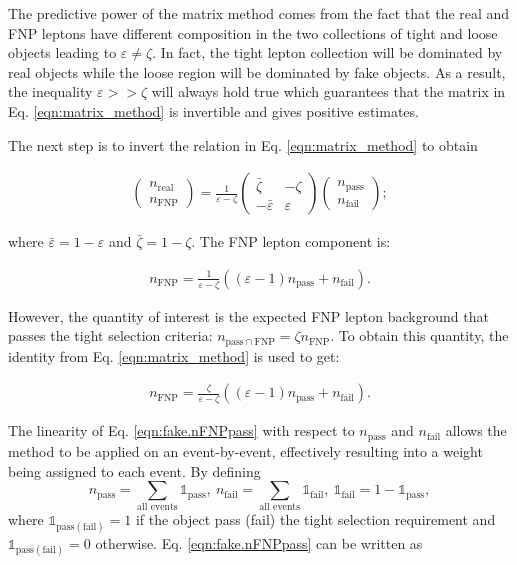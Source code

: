 The predictive power of the matrix method comes from the fact that 
the real and FNP leptons have different composition in the two collections 
of tight and loose objects leading to $\varepsilon \neq \zeta$. In fact, 
the tight lepton collection will be dominated by real objects while the 
loose region will be dominated by fake objects. As a result, 
the inequality $\varepsilon >> \zeta$ will always hold true which 
guarantees that the matrix in Eq. \ref{eqn:matrix_method} is invertible 
and gives positive estimates. 

The next step is to invert the relation in Eq. \ref{eqn:matrix_method} to 
obtain

\begin{align}
\begin{pmatrix}n_\text{real}\\n_\text{FNP}\end{pmatrix} 
= \frac{1}{\varepsilon - \zeta} \begin{pmatrix}\bar\zeta & -\zeta\\ -\bar\varepsilon & \varepsilon\end{pmatrix}
\begin{pmatrix}n_\text{pass}\\n_\text{fail}\end{pmatrix}; 
\label{eqn:fake.inv_matrix_method}
\end{align}

where $\bar\varepsilon = 1 - \varepsilon$ and  $\bar\zeta = 1 - \zeta$. 
The FNP lepton component is: 

\begin{align}
n_\text{FNP} = \frac{1}{\varepsilon - \zeta}\left(\left(\varepsilon-1\right)n_\text{pass}+n_\text{fail}\right).
\label{eqn:fake.nfake}
\end{align}

However, the quantity of interest is the expected FNP lepton background that 
passes the tight selection criteria: 
$n_{\text{pass}~\cap~\text{FNP}} = \zeta n_\text{FNP}$.
 To obtain this quantity, 
the identity from Eq. \ref{eqn:matrix_method} is used to get:

\begin{align}
n_\text{FNP} = \frac{\zeta}{\varepsilon - \zeta}\left(\left(\varepsilon-1\right)n_\text{pass}+n_\text{fail}\right).
\label{eqn:fake.nFNPpass}
\end{align}

The linearity of Eq. \ref{eqn:fake.nFNPpass}  with respect to $n_\text{pass}$ 
and $n_\text{fail}$ allows the method to be applied on an event-by-event, 
effectively resulting into a weight being assigned to each event. 
By defining
\[
  n_\text{pass} = \sum_\text{all events} \mathbb{1}_\text{pass},~
  n_\text{fail} = \sum_\text{all events} \mathbb{1}_\text{fail},~ 
  \mathbb{1}_\text{fail} = 1 -  \mathbb{1}_\text{pass},
\]
where $\mathbb{1}_{\text{pass} \left(\text{fail}\right)} = 1$ if the object pass (fail) the tight selection requirement and $\mathbb{1}_{\text{pass}\left(\text{fail}\right)} = 0$ otherwise. Eq. \ref{eqn:fake.nFNPpass} can be written as


